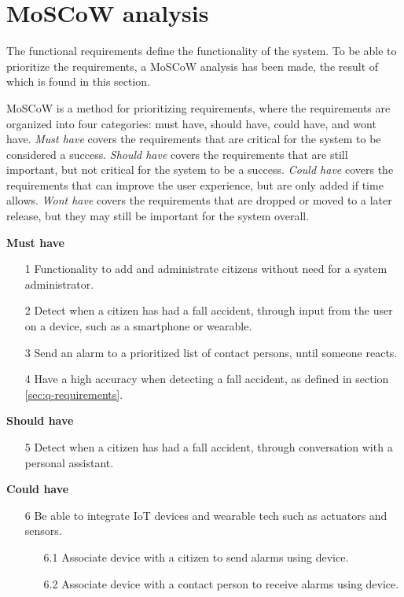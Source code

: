 \section{MoSCoW analysis} \label{moscow}
The functional requirements define the functionality of the system. To be able to prioritize the requirements, a MoSCoW analysis has been made, the result of which is found in this section.

MoSCoW is a method for prioritizing requirements, where the requirements are organized into four categories: must have, should have, could have, and wont have.
\textit{Must have} covers the requirements that are critical for the system to be considered a success. \textit{Should have} covers the requirements that are still important, but not critical for the system to be a success. \textit{Could have} covers the requirements that can improve the user experience, but are only added if time allows. \textit{Wont have} covers the requirements that are dropped or moved to a later release, but they may still be important for the system overall.

\textbf{Must have}

\begin{itemize}
    \item[1] Functionality to add and administrate citizens without need for a system administrator.
    \item[2] Detect when a citizen has had a fall accident, through input from the user on a device, such as a smartphone or wearable.
    \item[3] Send an alarm to a prioritized list of contact persons, until someone reacts.
    \item[4] Have a high accuracy when detecting a fall accident, as defined in section \ref{sec:q-requirements}.
\end{itemize}

\textbf{Should have}

\begin{itemize}
    \item[5] Detect when a citizen has had a fall accident, through conversation with a personal assistant.
\end{itemize}

\textbf{Could have}
\begin{itemize}
    \item[6] Be able to integrate IoT devices and wearable tech such as actuators and sensors.
        \begin{itemize}
            \item[6.1] Associate device with a citizen to send alarms using device.
            \item[6.2] Associate device with a contact person to receive alarms using device.
        \end{itemize}
\end{itemize}


